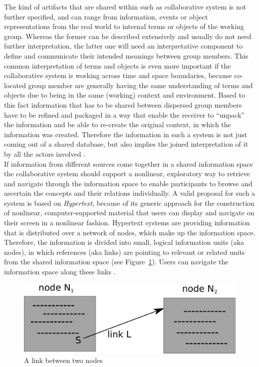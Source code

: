 The kind of artifacts that are shared within such as collaborative system is not further specified, and can range from information, events or object representations from the real world to internal terms or objects of the working group. Whereas the former can be described extensively and usually do not need further interpretation, the latter one will need an interpretative component to define and communicate their intended meanings between group members. This common interpretation of terms and objects is even more important if the collaborative system is working across time and space boundaries, because co-located group member are generally having the same understanding of terms and objects due to being in the same (working) context and environment. Based to this fact information that has to be shared between dispersed group members have to be refined and packaged in a way that enable the receiver to ``unpack'' the information and be able to re-create the original context, in which the information was created. Therefore the information in such a system is not just coming out of a shared database, but also implies the joined interpretation of it by all the actors involved \citep{bannon1997constructing}. \\

If information from different sources come together in a shared information space the collaborative system should support a nonlinear, exploratory way to retrieve and navigate through the information space to enable participants to browse and ascertain the concepts and their relations individually. A valid proposal for such a system is based on \emph{Hypertext}, because of its generic approach for the construction of nonlinear, computer-supported material that users can display and navigate on their screen in a nonlinear fashion. Hypertext systems are providing information that is distributed over a network of nodes, which make up the information space. Therefore, the information is divided into small, logical information units (aka nodes), in which references (aka links) are pointing to relevant or related units from the shared information space (see Figure~\ref{fig:images_cscw_hypertext_concept}). Users can navigate the information space along these links \citep[pg. 295-307]{borghoff2000computer}. \@

\begin{figure}[H]
  \centering
  \includegraphics[width=0.9\columnwidth]{images/Hypertext.pdf}
  \caption[A link between two nodes]{A link between two nodes \citep[pg. 303]{borghoff2000computer}}
  \label{fig:images_cscw_hypertext_concept}
\end{figure}

